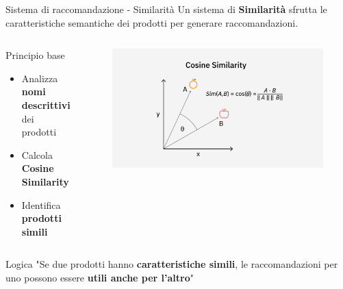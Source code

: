 \documentclass{beamer}
\begin{document}
	\begin{frame}{Sistema di raccomandazione - Similarità}
		Un sistema di \textbf{Similarità} sfrutta le caratteristiche semantiche dei prodotti per generare raccomandazioni.

		\begin{columns}
			\begin{column}{0.6\textwidth}
				\begin{block}{Principio base}
					\begin{itemize}
						\item Analizza \textbf{nomi descrittivi} dei prodotti
						\item Calcola \textbf{Cosine Similarity}
						\item Identifica \textbf{prodotti simili}
					\end{itemize}
				\end{block}
			\end{column}
			\begin{column}{0.5\textwidth}
				\begin{figure}
					\centering
					\includegraphics[width=\textwidth]{Cosine-Similarity.png}
				\end{figure}
			\end{column}
		\end{columns}

		\begin{alertblock}{Logica}
			"Se due prodotti hanno \textbf{caratteristiche simili}, le raccomandazioni per uno possono essere \textbf{utili anche per l'altro}"
		\end{alertblock}
	\end{frame}
\end{document}
